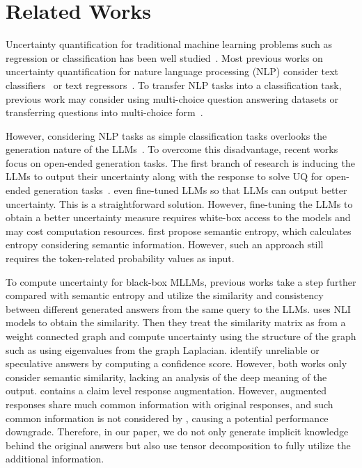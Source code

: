 \section{Related Works}
Uncertainty quantification for traditional machine learning problems such as regression or classification has been well studied~\cite{ye2024uncertainty,amini2020deep,sensoy2018evidential,ovadia2019can}. Most previous works on uncertainty quantification for nature language processing (NLP) consider text classifiers~\cite{jiang2021can,desai2020calibration,kamath2020selective} or text regressors~\cite{glushkova2021uncertainty,wang2022uncertainty}. To transfer NLP tasks into a classification task, previous work may consider using multi-choice question answering datasets or transferring questions into multi-choice form~\cite{kamath2020selective}. 

However, considering NLP tasks as simple classification tasks overlooks the generation nature of the LLMs~\cite{kuhn2023semantic}. To overcome this disadvantage, recent works focus on open-ended generation tasks. The first branch of research is inducing the LLMs to output their uncertainty along with the response to solve UQ for open-ended generation tasks~\cite{tian2023just,kadavath2022language,mielke2020linguistic}. \citet{lin2022teaching} even fine-tuned LLMs so that LLMs can output better uncertainty. This is a straightforward solution. However, fine-tuning the LLMs to obtain a better uncertainty measure requires white-box access to the models and may cost computation resources. \citet{kuhn2023semantic} first propose semantic entropy, which calculates entropy considering semantic information. However, such an approach still requires the token-related probability values as input.

To compute uncertainty for black-box MLLMs, previous works take a step further compared with semantic entropy and utilize the similarity and consistency between different generated answers from the same query to the LLMs. \citet{lin2023generating} uses NLI models to obtain the similarity. Then they treat the similarity matrix as from a weight connected graph and compute uncertainty using the structure of the graph such as using eigenvalues from the graph Laplacian. \citet{chen2024quantifying} identify unreliable or speculative answers by computing a confidence score. However, both works only consider semantic similarity, lacking an analysis of the deep meaning of the output. \citet{da2024llm} contains a claim level response augmentation. However,  augmented responses share much common information with original responses, and such common information is not considered by \citet{da2024llm}, causing a potential performance downgrade.  Therefore, in our paper, we do not only generate implicit knowledge behind the original answers but also use tensor decomposition to fully utilize the additional information.  

\vspace{-3mm}